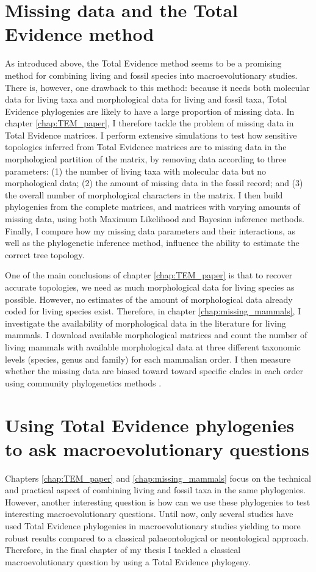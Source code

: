 \section{Missing data and the Total Evidence method}
As introduced above, the Total Evidence method seems to be a promising method for combining living and fossil species into macroevolutionary studies.
There is, however, one drawback to this method: because it needs both molecular data for living taxa and morphological data for living and fossil taxa, Total Evidence phylogenies are likely to have a large proportion of missing data.
In chapter \ref{chap:TEM_paper}, I therefore tackle the problem of missing data in Total Evidence matrices.
I perform extensive simulations to test how sensitive topologies inferred from Total Evidence matrices are to missing data in the morphological partition of the matrix, by removing data according to three parameters: (1) the number of living taxa with molecular data but no morphological data; (2) the amount of missing data in the fossil record; and (3) the overall number of morphological characters in the matrix.
I then build phylogenies from the complete matrices, and matrices with varying amounts of missing data, using both Maximum Likelihood and Bayesian inference methods.
Finally, I compare how my missing data parameters and their interactions, as well as the phylogenetic inference method, influence the ability to estimate the correct tree topology.

One of the main conclusions of chapter \ref{chap:TEM_paper} is that to recover accurate topologies, we need as much morphological data for living species as possible.
However, no estimates of the amount of morphological data already coded for living species exist.
Therefore, in chapter \ref{chap:missing_mammals}, I investigate the availability of morphological data in the literature for living mammals.
I download available morphological matrices and count the number of living mammals with available morphological data at three different taxonomic levels (species, genus and family) for each mammalian order.
I then measure whether the missing data are biased toward toward specific clades in each order using community phylogenetics methods \citep{webb2002phylogenies}.


\section{Using Total Evidence phylogenies to ask macroevolutionary questions}
Chapters \ref{chap:TEM_paper} and \ref{chap:missing_mammals} focus on the technical and practical aspect of combining living and fossil taxa in the same phylogenies.
However, another interesting question is how can we use these phylogenies to test interesting macroevolutionary questions.
Until now, only several studies have used Total Evidence phylogenies in macroevolutionary studies \citep[e.g.][]{Wood01032013,slaterphylogenetic2013,beckancient2014,Dembo2015} %
yielding to more robust results compared to a classical palaeontological or neontological approach.
Therefore, in the final chapter of my thesis I tackled a classical macroevolutionary question by using a Total Evidence phylogeny. 

